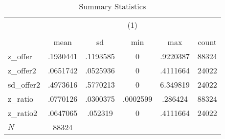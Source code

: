 \begin{table}[htbp]\centering
\def\sym#1{\ifmmode^{#1}\else\(^{#1}\)\fi}
\caption{Summary Statistics}
\begin{tabular}{l*{1}{ccccc}}
\hline\hline
            &\multicolumn{5}{c}{(1)}                                         \\
            &\multicolumn{5}{c}{}                                            \\
            &        mean&          sd&         min&         max&       count\\
\hline
z\_offer     &    .1930441&    .1193585&           0&    .9220387&       88324\\
z\_offer2    &    .0651742&    .0525936&           0&    .4111664&       24022\\
sd\_offer2   &    .4973616&    .5770213&           0&    6.349819&       24022\\
z\_ratio     &    .0770126&    .0300375&    .0002599&     .286424&       88324\\
z\_ratio2    &    .0647065&     .052319&           0&    .4111664&       24022\\
\hline
\(N\)       &       88324&            &            &            &            \\
\hline\hline
\end{tabular}
\end{table}
